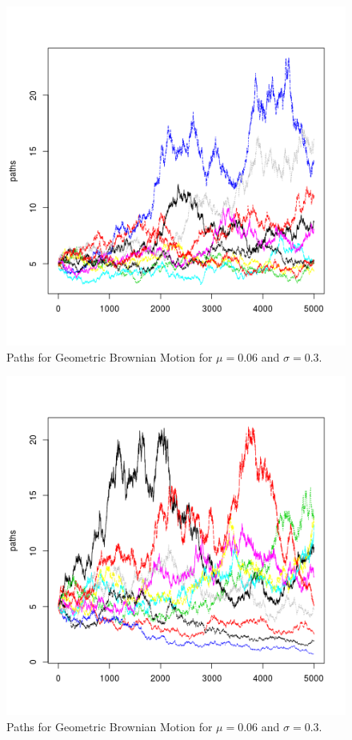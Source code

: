 \documentclass{article}
\begin{document}
			\begin{figure}[!ht]
  			\includegraphics[width=\linewidth]{pic/que1_1.png}
 			 \caption{Paths for Geometric Brownian Motion for $\mu=0.06$ and $\sigma=0.3$.}
  			\label{fig:hist1_1}
		\end{figure}
		
		\begin{figure}[!ht]
  			\includegraphics[width=\linewidth]{pic/que1_2.png}
 			 \caption{Paths for Geometric Brownian Motion for $\mu=0.06$ and $\sigma=0.3$.}
  			\label{fig:hist1_1}
		\end{figure}
		
\end{document}
